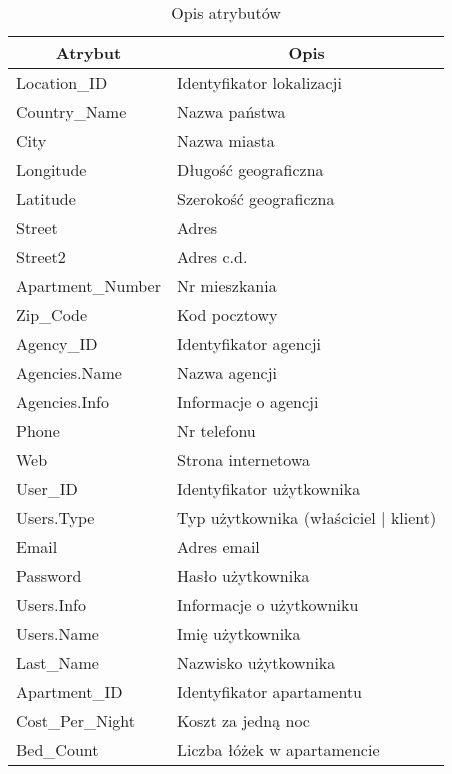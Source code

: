 \documentclass[polish, 11pt]{article}
\begin{document}
            \begin{table}[H]
                \centering
                \caption{Opis atrybutów}\label{tab:attributes}
                \begin{tabular}{ll}\toprule
                    \multicolumn{1}{c}{Atrybut}	&	\multicolumn{1}{c}{Opis}\\\midrule
                    Location\_ID	&	Identyfikator lokalizacji	\\
                    Country\_Name	&	Nazwa państwa	\\
                    City	&	Nazwa miasta	\\
                    Longitude	&	Długość geograficzna	\\
                    Latitude	&	Szerokość geograficzna	\\
                    Street	&	Adres	\\
                    Street2	&	Adres c.d.	\\
                    Apartment\_Number	&	Nr mieszkania	\\
                    Zip\_Code	&	Kod pocztowy	\\
                    Agency\_ID	&	Identyfikator agencji	\\
                    Agencies.Name	&	Nazwa agencji	\\
                    Agencies.Info	&	Informacje o agencji	\\
                    Phone	&	Nr telefonu	\\
                    Web	&	Strona internetowa	\\
                    User\_ID	&	Identyfikator użytkownika	\\
                    Users.Type	&	Typ użytkownika (właściciel | klient)	\\
                    Email	&	Adres email	\\
                    Password	&	Hasło użytkownika	\\
                    Users.Info	&	Informacje o użytkowniku	\\
                    Users.Name	&	Imię użytkownika	\\
                    Last\_Name	&	Nazwisko użytkownika	\\
                    Apartment\_ID	&	Identyfikator apartamentu	\\
                    Cost\_Per\_Night	&	Koszt za jedną noc	\\
                    Bed\_Count	&	Liczba łóżek w apartamencie	\\

\end{tabular}
\end{table}
\end{document}
